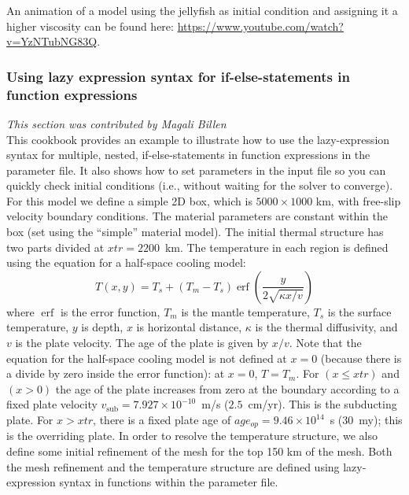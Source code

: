 \documentclass{article}
\DeclareMathOperator{\erf}{erf}
\begin{document}
An animation of a model using the jellyfish as initial condition and assigning it a higher viscosity can be found here: \url{https://www.youtube.com/watch?v=YzNTubNG83Q}.

\subsubsection{Using lazy expression syntax for if-else-statements in function expressions}
\label{sec:lazy-expression}
\textit{This section was contributed by Magali Billen}\\
This cookbook provides an example to illustrate how to use the lazy-expression syntax for multiple, nested, if-else-statements in function expressions in the parameter file. It also shows how to set parameters in the input file so you can quickly check initial conditions (i.e., without waiting for the solver to converge).  For this model we define a simple 2D box, which is $5000 \times 1000$ km, with free-slip velocity boundary conditions. The material parameters are constant within the box (set using the  ``simple'' material model). The initial thermal structure has two parts divided at $xtr=2200$~km. The temperature in each region is defined using the equation for a half-space cooling model:
\begin{equation}
T(x,y) = T_s + (T_m  - T_s) \erf{(\frac{y}{2\sqrt{\kappa x/v}})}
\end{equation}
where $\erf$ is the error function, $T_m$ is the mantle temperature, $T_s$ is the surface temperature, $y$ is depth, $x$ is horizontal distance, $\kappa$ is the thermal diffusivity, and $v$ is the plate velocity. The age of the plate is given by $x/v$. Note that the equation for the half-space cooling model is not defined at $x=0$ (because there is a divide by zero inside the error function): at $x=0$, $T=T_m$.  For $(x \le xtr)$ and $(x>0)$ the age of the plate increases from zero at the boundary according to a fixed plate velocity $v_\text{sub}=7.927\times10^{-10}$~m/s  ($2.5$~cm/yr). This is the subducting plate. For $x > xtr$, there is a fixed plate age of $age_{op}=9.46\times10^{14}$~s ($30$~my); this is the overriding plate. In order to resolve the temperature structure, we also define some initial refinement of the mesh for the top 150 km of the mesh. Both the mesh refinement and the temperature structure are defined using lazy-expression syntax in functions within the parameter file.
\end{document}
